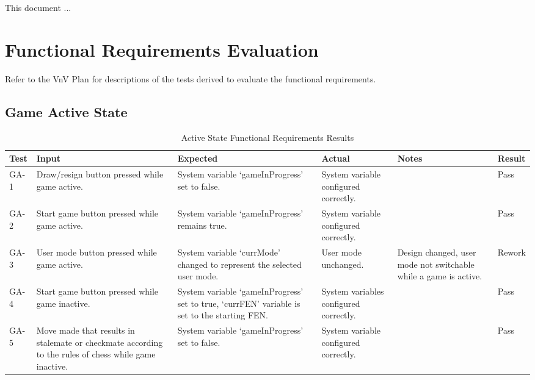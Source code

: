 \documentclass[12pt, titlepage]{article}
\begin{document}

This document ...

\section{Functional Requirements Evaluation}
Refer to the VnV Plan for descriptions of the tests derived to evaluate the functional requirements.
\subsection{Game Active State}

\begin{table}[H]
    \centering
        \setlength{\leftmargini}{0.4cm}
        \begin{tabular}{| >{\centering\arraybackslash}m{1cm} | 
            >{\centering\arraybackslash}m{2.5cm} | 
            >{\centering\arraybackslash}m{4cm} | 
            >{\centering\arraybackslash}m{3cm} |
            >{\centering\arraybackslash}m{3cm} |
            >{\centering\arraybackslash}m{1.5cm} |}
        \hline
        \rowcolor[gray]{0.9}
        Test & Input & Expected & Actual & Notes & Result\\
        \hline
        GA-1 & Draw/resign button pressed while game active. & System variable `gameInProgress' set to false. &  System variable configured correctly. &  & Pass \\
        \hline
        GA-2 & Start game button pressed while game active. & System variable `gameInProgress' remains true. &  System variable configured correctly. &  & Pass \\
        \hline
        GA-3 & User mode button pressed while game active. & System variable `currMode' changed to represent the selected user mode. &  User mode unchanged. & Design changed, user mode not switchable while a game is active. & Rework \\
        \hline
        GA-4 & Start game button pressed while game inactive. & System variable `gameInProgress' set to true, `currFEN' variable is set to the starting FEN. &  System variables configured correctly. &  & Pass \\
        \hline
        GA-5 & Move made that results in stalemate or checkmate according to the rules of chess while game inactive. & System variable `gameInProgress' set to false. &  System variable configured correctly. &  & Pass \\ 
        \hline
        \end{tabular}
    \caption{Active State Functional Requirements Results}
\end{table}
\end{document}
